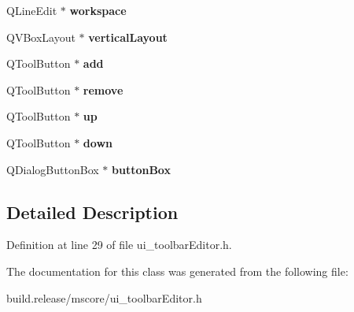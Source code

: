 \begin{DoxyCompactItemize}
Q\+Line\+Edit $\ast$ {\bfseries workspace}
\item 
\mbox{\label{class_ui___toolbar_editor_a9c2600b3f1b94274dfa8027d3cbfd9b0}} 
Q\+V\+Box\+Layout $\ast$ {\bfseries vertical\+Layout}
\item 
\mbox{\label{class_ui___toolbar_editor_a4eaa4dbb023e56ebfed33f5bec50eaaa}} 
Q\+Tool\+Button $\ast$ {\bfseries add}
\item 
\mbox{\label{class_ui___toolbar_editor_a2653d66ac97e47400856a5fb51d9ee04}} 
Q\+Tool\+Button $\ast$ {\bfseries remove}
\item 
\mbox{\label{class_ui___toolbar_editor_a031392668b9271dd88301689b83f24b2}} 
Q\+Tool\+Button $\ast$ {\bfseries up}
\item 
\mbox{\label{class_ui___toolbar_editor_a6eb95d23190ddf2deef740aaccf745f9}} 
Q\+Tool\+Button $\ast$ {\bfseries down}
\item 
\mbox{\label{class_ui___toolbar_editor_afeac2f0a7f528a755d9dc3e245a42da4}} 
Q\+Dialog\+Button\+Box $\ast$ {\bfseries button\+Box}
\end{DoxyCompactItemize}


\subsection{Detailed Description}


Definition at line 29 of file ui\+\_\+toolbar\+Editor.\+h.



The documentation for this class was generated from the following file\+:\begin{DoxyCompactItemize}
\item 
build.\+release/mscore/ui\+\_\+toolbar\+Editor.\+h\end{DoxyCompactItemize}
